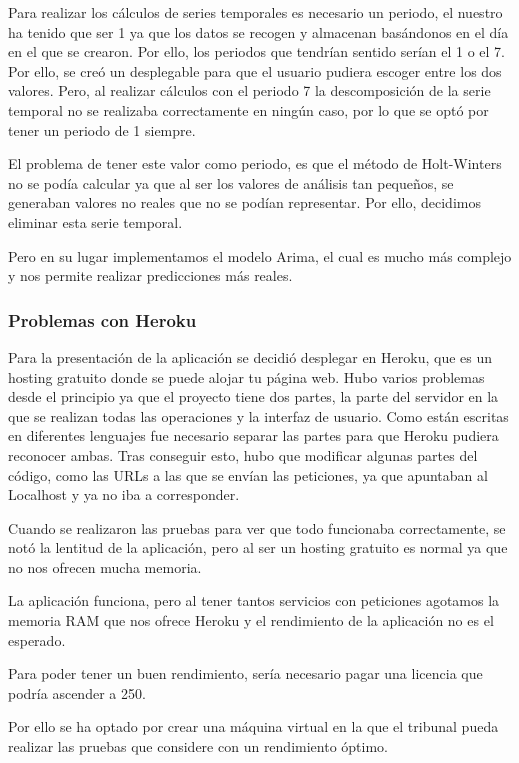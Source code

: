 Para realizar los cálculos de series temporales es necesario un periodo, el nuestro ha tenido que ser 1 ya que los datos se recogen y almacenan basándonos en el día en el que se crearon. Por ello, los periodos que tendrían sentido serían el 1 o el 7. 
Por ello, se creó un desplegable para que el usuario pudiera escoger entre los dos valores. Pero, al realizar cálculos con el periodo 7 la descomposición de la serie temporal no se realizaba correctamente en ningún caso, por lo que se optó por tener un periodo de 1 siempre.

El problema de tener este valor como periodo, es que el método de Holt-Winters no se podía calcular ya que al ser los valores de análisis tan pequeños, se generaban valores no reales que no se podían representar.
Por ello, decidimos eliminar esta serie temporal.

Pero en su lugar implementamos el modelo Arima, el cual es mucho más complejo y nos permite realizar predicciones más reales.

\subsubsection{Problemas con Heroku}

Para la presentación de la aplicación se decidió desplegar en Heroku, que es un hosting gratuito donde se puede alojar tu página web.
Hubo varios problemas desde el principio ya que el proyecto tiene dos partes, la parte del servidor en la que se realizan todas las operaciones y la interfaz de usuario.
Como están escritas en diferentes lenguajes fue necesario separar las partes para que Heroku pudiera reconocer ambas.
Tras conseguir esto, hubo que modificar algunas partes del código, como las URLs a las que se envían las peticiones, ya que apuntaban al Localhost y ya no iba a corresponder.

Cuando se realizaron las pruebas para ver que todo funcionaba correctamente, se notó la lentitud de la aplicación, pero al ser un hosting gratuito es normal ya que no nos ofrecen mucha memoria.

La aplicación funciona, pero al tener tantos servicios con peticiones agotamos la memoria RAM que nos ofrece Heroku y el rendimiento de la aplicación no es el esperado.

Para poder tener un buen rendimiento, sería necesario pagar una licencia que podría ascender a 250\EUR{}.

Por ello se ha optado por crear una máquina virtual en la que el tribunal pueda realizar las pruebas que considere con un rendimiento óptimo.


